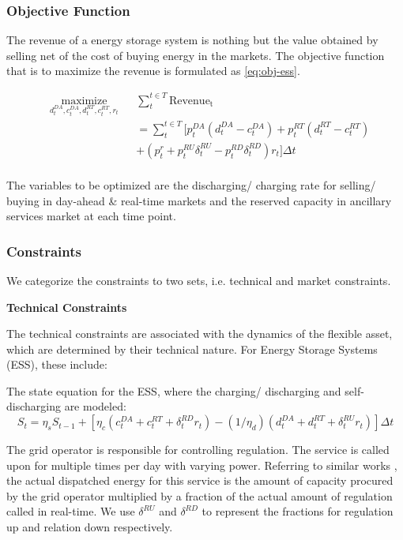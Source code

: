 \subsubsection{Objective Function}
The revenue of a energy storage system is nothing but the value obtained by selling net of the cost of buying energy in the markets. The objective function that is to maximize the revenue is formulated as \ref{eq:obj-ess}.

\begin{equation}
\label{eq:obj-ess}
\begin{aligned}
& \underset{d_t^{DA}, c_t^{DA}, d_t^{RT}, c_t^{RT}, r_t}{\text{maximize}}
& & \sum_t^{t \in T} \mathrm{Revenue_t} \\
& & &= \sum_t^{t \in T} [p_t^{DA} (d_t^{DA}-c_t^{DA}) + p_t^{RT} (d_t^{RT}-c_t^{RT})  \\
& & &    + (p_t^r+p_t^{RU} \delta_t^{RU}-p_t^{RD} \delta_t^{RD}) r_t] \Delta t \\
\end{aligned}
\end{equation}

The variables to be optimized are the discharging/ charging rate for selling/ buying in day-ahead \& real-time markets and the reserved capacity in ancillary services market at each time point.

\subsubsection{Constraints}
We categorize the constraints to two sets, i.e. technical and market constraints.

\textbf{Technical Constraints}

The technical constraints are associated with the dynamics of the flexible asset, which are determined by their technical nature. For Energy Storage Systems (ESS), these include:

The state equation for the ESS, where the charging/ discharging and self-discharging are modeled:
\begin{equation}
\label{eq:state-ess}
S_t = \eta_s S_{t-1} + [\eta_c(c_t^{DA}+c_t^{RT}+\delta^{RD}_t r_t)  - (1/\eta_d)(d_t^{DA}+d_t^{RT}+\delta^{RU}_t r_t)]\Delta t
\end{equation}

The grid operator is responsible for controlling regulation. The service is called upon for multiple times per day with varying power. Referring to similar works \cite{Berrada2016} \cite{Byrne2012}, the actual dispatched energy for this service is the amount of capacity procured by the grid operator multiplied by a fraction of the actual amount of regulation called in real-time. We use $\delta^{RU}$ and $\delta^{RD}$ to represent the fractions for regulation up and relation down respectively. 

